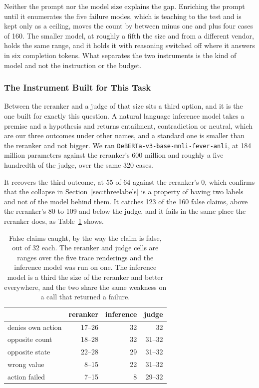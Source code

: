 \documentclass[11pt,a4paper]{article}
\begin{document}
Neither the prompt nor the model size explains the gap. Enriching the prompt until it
enumerates the five failure modes, which is teaching to the test and is kept only as a
ceiling, moves the count by between minus one and plus four cases of 160. The smaller model, at roughly a fifth the
size and from a different vendor, holds the same range, and it holds it with reasoning
switched off where it answers in six completion tokens. What separates the two
instruments is the kind of model and not the instruction or the budget.

\subsubsection{The Instrument Built for This Task}

Between the reranker and a judge of that size sits a third option, and it is the one
built for exactly this question. A natural language inference model takes a premise and a
hypothesis and returns entailment, contradiction or neutral, which are our three
outcomes under other names, and a standard one is smaller than the reranker and not
bigger. We ran \texttt{DeBERTa-v3-base-mnli-fever-anli}, at 184 million parameters against the
reranker's 600 million and roughly a five hundredth of the judge, over the same 320
cases.

It recovers the third outcome, at 55 of 64 against the reranker's 0, which confirms
that the collapse in Section~\ref{sec:threelabels} is a property of having two labels
and not of the model behind them. It catches 123 of the 160 false claims, above the
reranker's 80 to 109 and below the judge, and it fails in the same place the reranker
does, as Table~\ref{tab:modes} shows.

\begin{table}[htbp]
\centering
\small
\caption{False claims caught, by the way the claim is false, out of 32 each. The
reranker and judge cells are ranges over the five trace renderings and the inference
model was run on one. The inference model is a third the size of the reranker and
better everywhere, and the two share the same weakness on a call that returned a
failure.}
\label{tab:modes}
\begin{tabular}{lrrr}
\toprule
& \textbf{reranker} & \textbf{inference} & \textbf{judge} \\
\midrule
denies own action  & 17--26 & 32 & 32 \\
opposite count     & 18--28 & 32 & 31--32 \\
opposite state     & 22--28 & 29 & 31--32 \\
wrong value        &  8--15 & 22 & 31--32 \\
action failed      &  7--15 &  8 & 29--32 \\
\bottomrule
\end{tabular}
\end{table}
\end{document}
